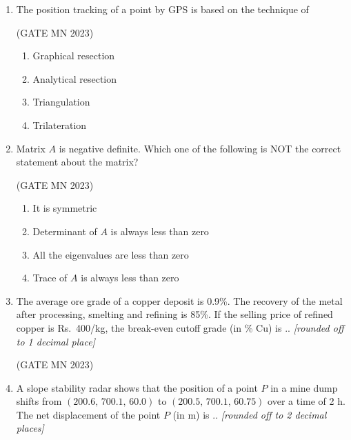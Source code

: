 \documentclass[journal]{IEEEtran}
\begin{document}
\begin{enumerate}
	\hfill(GATE MN 2023)
\begin{multicols}{4}
\begin{enumerate}[label=(\Alph*)]
    \item \(27^\circ N\)  
    \item \(63^\circ N\)  
    \item \(27^\circ S\)  
    \item \(63^\circ S\)  
\end{enumerate}
\end{multicols}

\item The position tracking of a point by GPS is based on the technique of

	\hfill(GATE MN 2023)
\begin{multicols}{2}
\begin{enumerate}
    \item Graphical resection
    \item Analytical resection
    \item Triangulation
    \item Trilateration
\end{enumerate}
\end{multicols}

\item Matrix $A$ is negative definite. Which one of the following is NOT the correct statement about the matrix?

	\hfill(GATE MN 2023)
\begin{multicols}{2}
\begin{enumerate}
    \item It is symmetric
    \item Determinant of $A$ is always less than zero
    \item All the eigenvalues are less than zero
    \item Trace of $A$ is always less than zero
\end{enumerate}
\end{multicols}

\item The average ore grade of a copper deposit is 0.9\%. The recovery of the metal after processing, smelting and refining is 85\%. If the selling price of refined copper is Rs.~400/kg, the break-even cutoff grade (in \% Cu) is \underline{\hspace{2cm}}..  
\textit{[rounded off to 1 decimal place]}

\hfill(GATE MN 2023)
\item A slope stability radar shows that the position of a point $P$ in a mine dump shifts from $(200.6,\, 700.1,\, 60.0)$ to $(200.5,\, 700.1,\, 60.75)$ over a time of 2 h. The net displacement of the point $P$ (in m) is \underline{\hspace{2cm}}..  
\textit{[rounded off to 2 decimal places]}


\end{enumerate}
\end{document}

